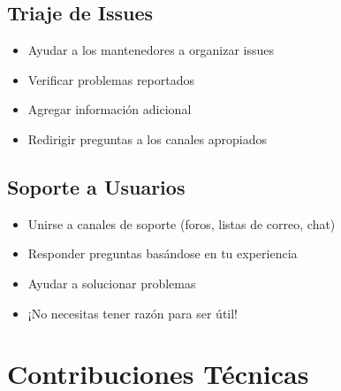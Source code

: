 \documentclass{presentacion}
\begin{document}
\subsection{Triaje de Issues}
\begin{frame}
    \begin{itemize}[<+->]
        \item Ayudar a los mantenedores a organizar issues
        \item Verificar problemas reportados
        \item Agregar información adicional
        \item Redirigir preguntas a los canales apropiados
    \end{itemize}
    
    \vspace{1em}
\end{frame}

\subsection{Soporte a Usuarios}
\begin{frame}
    \begin{itemize}[<+->]
        \item Unirse a canales de soporte (foros, listas de correo, chat)
        \item Responder preguntas basándose en tu experiencia
        \item Ayudar a solucionar problemas
        \item ¡No necesitas tener razón para ser útil!
    \end{itemize}
    
    \vspace{1em}
\end{frame}

\section{Contribuciones Técnicas}
\end{document}
